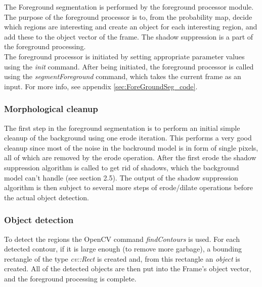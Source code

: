 The Foreground segmentation is performed by the foreground processor module. The purpose of the foreground processor is to, from the probability map, decide which regions are interesting and create an object for each interesting region, and add these to the object vector of the frame. The shadow suppression is a part of the foreground processing. \\
\newline
The foreground processor is initiated by setting appropriate parameter values using the \emph{init} command. After being initiated, the foreground processor is called using the \emph{segmentForeground} command, which takes the current frame as an input. For more info, see appendix \ref{sec:ForeGroundSeg_code}.

\subsubsection{Morphological cleanup}
The first step in the foreground segmentation is to perform an initial simple cleanup of the background using one erode iteration. This performs a very good cleanup since most of the noise in the backround model is in form of single pixels, all of which are removed by the erode operation. After the first erode the shadow suppression algorithm is called to get rid of shadows, which the background model can't handle (see section 2.5). The output of the shadow suppression algorithm is then subject to several more steps of erode/dilate operations before the actual object detection.


\subsubsection{Object detection}
To detect the regions the OpenCV command \emph{findContours} is used. For each detected contour, if it is large enough (to remove more garbage), a bounding rectangle of the type \emph{cv::Rect} is created and, from this rectangle an \emph{object} is created. All of the detected objects are then put into the Frame's object vector, and the foreground processing is complete.